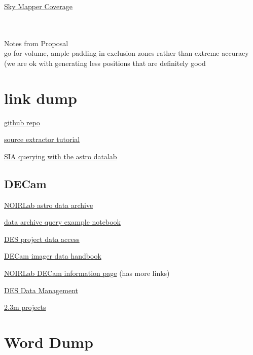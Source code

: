\documentclass{article}
\begin{document}
\href{https://datalab.noirlab.edu/skymapper.php#:~:text=SMSS%20published%20its%20Fourth%20Data,observed%20up%20to%20%2B28%C2%B0.} {Sky Mapper Coverage}

\\
\\
Notes from Proposal\\
go for volume, ample padding in exclusion zones rather than extreme accuracy (we are ok with generating less positions that are definitely good

  \section{link dump}

  \href{https://github.com/cyb0rb/WiFeS_Catalog}{github repo}
  
  \href{https://sep.readthedocs.io/en/v1.1.x/tutorial.html}{source extractor tutorial}

  \href{https://github.com/astro-datalab/notebooks-latest/blob/aa7e2954d538632a5f0a26665c91906ca2c9cfbc/04_HowTos/SiaService/How_to_use_the_Simple_Image_Access_service.ipynb}{SIA querying with the astro datalab}

\subsection{DECam}
  \href{https://astroarchive.noirlab.edu/api/docs/}{NOIRLab astro data archive}

  \href{https://github.com/NOAO/nat-nb/blob/master/sia.ipynb}{data archive query example notebook}

  \href{https://www.darkenergysurvey.org/the-des-project/data-access/}{DES project data access}

  \href{https://noirlab.edu/science/sites/default/files/media/archives/documents/scidoc0436.pdf}{DECam imager data handbook}
  
  \href{https://noirlab.edu/science/programs/ctio/instruments/Dark-Energy-Camera}{NOIRLab DECam information page} (has more links)
  
  \href{https://des.ncsa.illinois.edu/releases/other}{DES Data Management}

  \href{https://aus01.safelinks.protection.outlook.com/?url=https}{2.3m projects}


\section{Word Dump}
\end{document}
